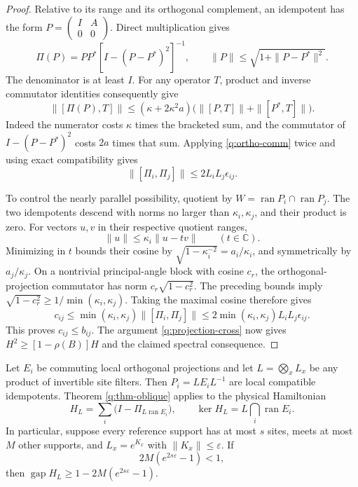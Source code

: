 \begin{proof}
Relative to its range and its orthogonal complement, an idempotent has
the form $P=\left(\begin{smallmatrix}I&A\\0&0\end{smallmatrix}\right)$.
Direct multiplication gives
\begin{equation}
 \Pi(P)=PP^*[I-(P-P^*)^2]^{-1},\qquad
 \|P\|\leq\sqrt{1+\|P-P^*\|^2}.
 \label{q:orthogonalizer}
\end{equation}
The denominator is at least $I$.  For any operator $T$, product and
inverse commutator identities consequently give
\begin{equation}
 \|[\Pi(P),T]\|
 \leq (\kappa+2\kappa^2a)
          \bigl(\|[P,T]\|+\|[P^*,T]\|\bigr).
 \label{q:ortho-comm}
\end{equation}
Indeed the numerator costs $\kappa$ times the bracketed sum, and the
commutator of $I-(P-P^*)^2$ costs $2a$ times that sum.  Applying
\eqref{q:ortho-comm} twice and using exact compatibility gives
\[
 \|[\Pi_i,\Pi_j]\|\leq2L_iL_j\epsilon_{ij}.
\]

To control the nearly parallel possibility, quotient by
$W=\operatorname{ran}P_i\cap\operatorname{ran}P_j$.  The two idempotents
descend with norms no larger than $\kappa_i,\kappa_j$, and their product
is zero.  For vectors $u,v$ in their respective quotient ranges,
\[
 \|u\|\leq\kappa_i\|u-tv\|\qquad(t\in\mathbb C).
\]
Minimizing in $t$ bounds their cosine by
$\sqrt{1-\kappa_i^{-2}}=a_i/\kappa_i$, and symmetrically by
$a_j/\kappa_j$.  On a nontrivial principal-angle block with cosine $c_r$,
the orthogonal-projection commutator has norm
$c_r\sqrt{1-c_r^2}$.  The preceding bounds imply
$\sqrt{1-c_r^2}\geq1/\min(\kappa_i,\kappa_j)$.
Taking the maximal cosine therefore gives
\[
 c_{ij}\leq\min(\kappa_i,\kappa_j)\|[\Pi_i,\Pi_j]\|
 \leq2\min(\kappa_i,\kappa_j)L_iL_j\epsilon_{ij}.
\]
This proves $c_{ij}\leq b_{ij}$.  The argument
\eqref{q:projection-cross} now gives $H^2\geq[1-\rho(B)]H$ and the
claimed spectral consequence.
\end{proof}

\begin{corollary}
\label{q:cor-filtered}
Let $E_i$ be commuting local orthogonal projections and let
$L=\bigotimes_x L_x$ be any product of invertible site filters.  Then
$P_i=LE_iL^{-1}$ are local compatible idempotents.  Theorem
\ref{q:thm-oblique} applies to the physical Hamiltonian
\[
 H_L=\sum_i\bigl(I-\Pi_{L\operatorname{ran}E_i}\bigr),
 \qquad
 \ker H_L=L\bigcap_i\operatorname{ran}E_i.
\]
In particular, suppose every reference support has at most $s$ sites,
meets at most $M$ other supports, and $L_x=e^{K_x}$ with
$\|K_x\|\leq\varepsilon$.  If
\[
 2M(e^{2s\varepsilon}-1)<1,
\]
then $\operatorname{gap}H_L\geq1-2M(e^{2s\varepsilon}-1)$.
\end{corollary}


